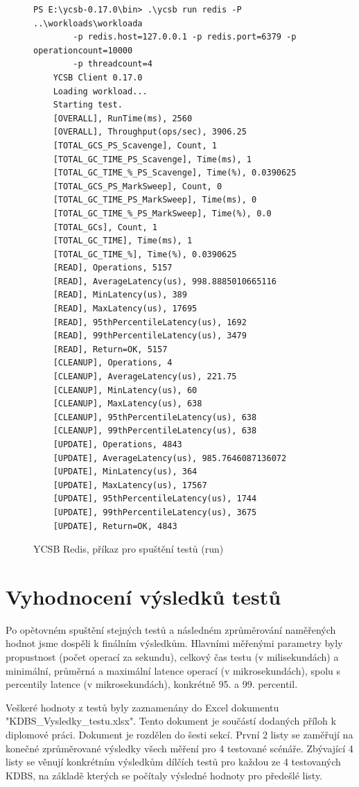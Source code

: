 \documentclass[czech,master,dept460,male,csharp,cpdeclaration]{diploma}
\begin{document}
	\begin{figure}[H]
	\centering
	\begin{lstlisting}[style=DOS]
	PS E:\ycsb-0.17.0\bin> .\ycsb run redis -P ..\workloads\workloada
		-p redis.host=127.0.0.1 -p redis.port=6379 -p operationcount=10000
		-p threadcount=4
	YCSB Client 0.17.0
	Loading workload...
	Starting test.
	[OVERALL], RunTime(ms), 2560
	[OVERALL], Throughput(ops/sec), 3906.25
	[TOTAL_GCS_PS_Scavenge], Count, 1
	[TOTAL_GC_TIME_PS_Scavenge], Time(ms), 1
	[TOTAL_GC_TIME_%_PS_Scavenge], Time(%), 0.0390625
	[TOTAL_GCS_PS_MarkSweep], Count, 0
	[TOTAL_GC_TIME_PS_MarkSweep], Time(ms), 0
	[TOTAL_GC_TIME_%_PS_MarkSweep], Time(%), 0.0
	[TOTAL_GCs], Count, 1
	[TOTAL_GC_TIME], Time(ms), 1
	[TOTAL_GC_TIME_%], Time(%), 0.0390625
	[READ], Operations, 5157
	[READ], AverageLatency(us), 998.8885010665116
	[READ], MinLatency(us), 389
	[READ], MaxLatency(us), 17695
	[READ], 95thPercentileLatency(us), 1692
	[READ], 99thPercentileLatency(us), 3479
	[READ], Return=OK, 5157
	[CLEANUP], Operations, 4
	[CLEANUP], AverageLatency(us), 221.75
	[CLEANUP], MinLatency(us), 60
	[CLEANUP], MaxLatency(us), 638
	[CLEANUP], 95thPercentileLatency(us), 638
	[CLEANUP], 99thPercentileLatency(us), 638
	[UPDATE], Operations, 4843
	[UPDATE], AverageLatency(us), 985.7646087136072
	[UPDATE], MinLatency(us), 364
	[UPDATE], MaxLatency(us), 17567
	[UPDATE], 95thPercentileLatency(us), 1744
	[UPDATE], 99thPercentileLatency(us), 3675
	[UPDATE], Return=OK, 4843
	\end{lstlisting}
	\caption{YCSB Redis, příkaz pro spuštění testů (run)
	\label{ps-ycsb-run}}
	\end{figure}

	\section{Vyhodnocení výsledků testů}
	
	Po opětovném spuštění stejných testů a následném zprůměrování naměřených hodnot jsme dospěli k finálním výsledkům. Hlavními měřenými parametry byly propustnost (počet operací za sekundu), celkový čas testu (v milisekundách) a minimální, průměrná a maximální latence operací (v mikrosekundách), spolu s percentily latence (v mikrosekundách), konkrétně 95. a 99. percentil.
	
	Veškeré hodnoty z testů byly zaznamenány do Excel dokumentu~\cite{excel} "KDBS\_Vysledky\_testu.xlsx". Tento dokument je součástí dodaných příloh k diplomové práci. Dokument je rozdělen do šesti sekcí. První 2 listy se zaměřují na konečné zprůměrované výsledky všech měření pro 4 testované scénáře. Zbývající 4 listy se věnují konkrétním výsledkům dílčích testů pro každou ze 4 testovaných KDBS, na základě kterých se počítaly výsledné hodnoty pro předešlé listy.
	
\end{document}
